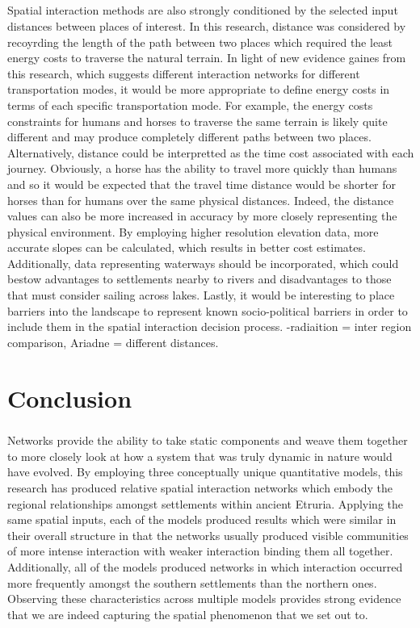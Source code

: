 \documentclass[12pt,a4paper]{thesis}
\begin{document}
\paragraph{}
Spatial interaction methods are also strongly conditioned by the selected input distances between places of interest. In this research, distance was considered by recoyrding the length of the path between two places which required the least energy costs to traverse the natural terrain. In light of new evidence gaines from this research, which suggests different interaction networks for different transportation modes, it would be more appropriate to define energy costs in terms of each specific transportation mode. For example, the energy costs constraints for humans and horses to traverse the same terrain is likely quite different and may produce completely different paths between two places. Alternatively, distance could be interpretted as the time cost associated with each journey. Obviously, a horse has the ability to travel more quickly than humans and so it would be expected that the travel time distance would be shorter for horses than for humans over the same physical distances. Indeed, the distance values can also be more increased in accuracy by more closely representing the physical environment. By employing higher resolution elevation data, more accurate slopes can be calculated, which results in better cost estimates. Additionally, data representing waterways should be incorporated, which could bestow advantages to settlements nearby to rivers and disadvantages to those that must consider sailing across lakes. Lastly, it would be interesting to place barriers into the landscape to represent known socio-political barriers in order to include them in the spatial interaction decision process.  
-radiaition = inter region comparison, Ariadne = different distances.


\chapter{Conclusion}

\paragraph{}
Networks provide the ability to take static components and weave them together to more closely look at how a system that was truly dynamic in nature would have evolved. By employing three conceptually unique quantitative models, this research has produced relative spatial interaction networks which embody the regional relationships amongst settlements within ancient Etruria. Applying the same spatial inputs, each of the models produced results which were similar in their overall structure in that the networks usually produced visible communities of more intense interaction with weaker interaction binding them all together. Additionally, all of the models produced networks in which interaction occurred more frequently amongst the southern settlements than the northern ones. Observing these characteristics across multiple models provides strong evidence that we are indeed capturing the spatial phenomenon that we set out to.     
\end{document}
